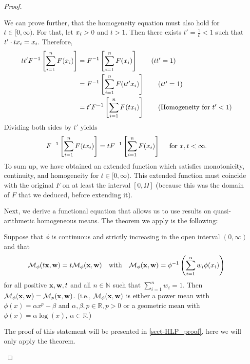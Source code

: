 \begin{proof}
\begin{proofpart}
		We can prove further, that the homogeneity equation must also hold for $t \in [0, \infty)$.	For that, let $x_i > 0$ and $t > 1$. Then there exists $t' = \frac{1}{t} < 1$ such that $t' \cdot t x_i = x_i$. Therefore,
		\begin{align*}
			t t' F^{-1} \left[ \sum_{i=1}^{n} F(x_i) \right] & = F^{-1} \left[ \sum_{i=1}^{n} F(x_i) \right] \tag{$t t' = 1$}     \\
			                                                   & = F^{-1} \left[ \sum_{i=1}^{n} F(t t'x_i) \right] \tag{$t t' = 1$} \\
                                                         & = t' F^{-1} \left[ \sum_{i=1}^{n} F(t x_i) \right] \tag{Homogeneity for $t' < 1$}
		\end{align*}
		Dividing both sides by $t'$ yields
		\begin{equation*}
			F^{-1} \left[ \sum_{i=1}^{n} F(t x_i) \right] = t F^{-1} \left[ \sum_{i=1}^{n} F(x_i) \right] \quad \text{ for } x, t < \infty .
		\end{equation*}
		To sum up, we have obtained an extended function which satisfies monotonicity, continuity, and homogeneity for $t \in [0, \infty)$. This extended function must coincide with the original $F$ on at least the interval $[0, \Omega]$ (because this was the domain of $F$ that we deduced, before extending it).
	\end{proofpart}

	\begin{proofpart}
		Next, we derive a functional equation that allows us to use results on quasi-arithmetic homogeneous means. The theorem we apply is the following:
		\begin{thm*}
			Suppose that $\phi$ is continuous and strictly increasing in the open interval $(0,\infty)$ and that
			\begin{equation*}
				\mathcal{M}_{\phi}(t \mathbf{x},\mathbf{w}) = t \mathcal{M}_{\phi}( \mathbf{x},\mathbf{w}) \quad  \text{with} \quad \mathcal{M}_{\phi}(\mathbf{x} ,\mathbf{w}) = \phi^{-1} \left ( \sum_{i=1}^{n} w_i \phi(x_i) \right)
			\end{equation*}
			for all positive $\mathbf{x}, \mathbf{w}, t$ and all $n \in \mathbb{N}$ such that $\sum_{i=1}^{n} w_i = 1$. Then $\mathcal{M}_{\phi}(\mathbf{x},\mathbf{w}) = \mathcal{M}_{p}(\mathbf{x}, \mathbf{w})$. (i.e., $\mathcal{M}_{\phi}(\mathbf{x},\mathbf{w})$ is either a power mean with $\phi(x) = \alpha x^p + \beta$ and $\alpha, \beta, p \in \mathbb{R}, p > 0$ or a geometric mean with $\phi(x) = \alpha \log (x)$, $\alpha \in \mathbb{R}.$)
		\end{thm*}
		The proof of this statement will be presented in \cref{sect-HLP_proof}, here we will only apply the theorem.


\end{proofpart}
\end{proof}
